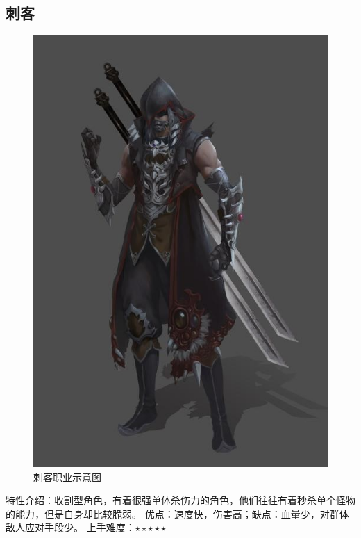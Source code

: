 \documentclass[UTF8,AutoFakeBold=1,AutoFakeSlant,zihao=-4]{cucthesis}
\begin{document}
\subsection{刺客}
\begin{figure}[ht]
    \centering
    \includegraphics[scale=0.24]{imgs/刺客.jpg}    
    \caption{刺客职业示意图}
\end{figure}

特性介绍：收割型角色，有着很强单体杀伤力的角色，他们往往有着秒杀单个怪物的能力，但是自身却比较脆弱。
优点：速度快，伤害高；缺点：血量少，对群体敌人应对手段少。
上手难度：$\star\star\star\star\star$
\end{document}
